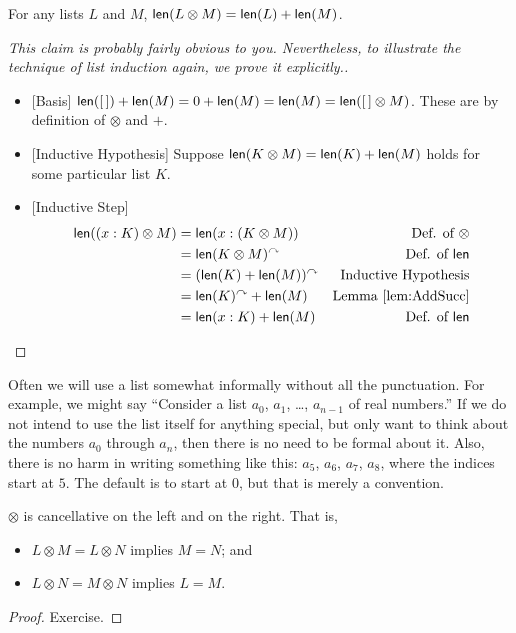 \begin{lemma}
  For any lists $L$ and $M$, $\mathord{\textsf{len}}(L\otimes M) = \mathord{\textsf{len}}(L)+\mathord{\textsf{len}}(M)$.

\begin{proof} [This claim is probably fairly obvious to
  you. Nevertheless, to illustrate the technique of list
  induction again, we prove it explicitly.]
  \begin{itemize}
  \item {}[Basis] $\mathord{\textsf{len}}([\,]) + \mathord{\textsf{len}}(M) = 0 + \mathord{\textsf{len}}(M) = \mathord{\textsf{len}}(M) =
    \mathord{\textsf{len}}([\,]\otimes M)$. These are by definition of $\otimes$ and $+$.
  \item{} [Inductive Hypothesis] Suppose $\mathord{\textsf{len}}(K\otimes M) = \mathord{\textsf{len}}(K)
    + \mathord{\textsf{len}}(M)$ holds for some particular list $K$.
  \item{} [Inductive Step]
    \begin{align*}
      \mathord{\textsf{len}}((x:K)\otimes M) &= \mathord{\textsf{len}}(x:(K\otimes M)) &\mbox{Def. of $\otimes$}\\
      &= \mathord{\textsf{len}}(K\otimes M)^\curvearrowright &\mbox{Def. of $\mathord{\textsf{len}}$}\\
      &= (\mathord{\textsf{len}}(K)+\mathord{\textsf{len}}(M))^\curvearrowright &\mbox{Inductive Hypothesis}\\
      &= \mathord{\textsf{len}}(K)^\curvearrowright + \mathord{\textsf{len}}(M) &\mbox{Lemma \ref{lem:AddSucc}}\\
      &= \mathord{\textsf{len}}(x:K) + \mathord{\textsf{len}}(M) &\mbox{Def. of $\mathord{\textsf{len}}$}
    \end{align*}
  \end{itemize}
\end{proof}
\end{lemma}

Often we will use a list somewhat informally without all the
punctuation. For example, we might say ``Consider a list $a_0$, $a_1$,
\ldots, $a_{n-1}$ of real numbers.'' If we do not intend to use the list
itself for anything special, but only want to think about the numbers
$a_0$ through $a_n$, then there is no need to be formal about
it. Also, there is no harm in writing something like this: $a_5$,
$a_6$, $a_7$, $a_8$, where the indices start at
$5$. The default is to start at $0$, but that is merely a convention.

\begin{lemma}\label{lem:concat-cancellative}
$\otimes$ is cancellative on the left and on the right. That is,
\begin{itemize}
	\item $L\otimes M = L\otimes N$ implies $M=N$; and
	\item $L\otimes N = M\otimes N$ implies $L=M$.
\end{itemize}	

\begin{proof}
	Exercise.
\end{proof}
\end{lemma}

